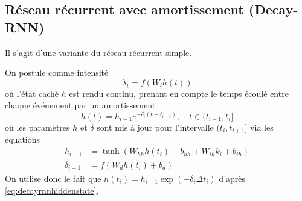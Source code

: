 \documentclass[11pt]{article}
\begin{document}
\subsection{Réseau récurrent avec amortissement (Decay-RNN)}

Il s'agit d'une variante du réseau récurrent simple.

On postule comme intensité
\begin{equation}\label{eq:decayrnnhiddenstate}
	\lambda_t = f(W_l h(t))
\end{equation}
où l'état caché $h$ est rendu continu, prenant en compte le temps écoulé entre chaque événement par un amortissement
\begin{equation}
	h(t) = h_{i-1}e^{-\delta_i(t-t_{i-1})},\quad t\in(t_{i-1},t_i]
\end{equation}
où les paramètres $h$ et $\delta$ sont mis à jour pour l'intervalle $(t_i,t_{i+1}]$ via les équations
\begin{align}
	h_{i+1} &= \tanh(W_{hh}h(t_i) + b_{hh} + W_{ih}k_i + b_{ih}) \\
	\delta_{i+1} &= f(W_dh(t_i) + b_d)
\end{align}
On utilise donc le fait que $h(t_i) = h_{i-1}\exp(-\delta_i\Delta t_i)$ d'après \eqref{eq:decayrnnhiddenstate}.
\end{document}
